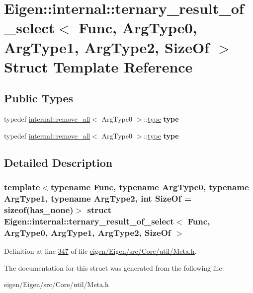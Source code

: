 \hypertarget{struct_eigen_1_1internal_1_1ternary__result__of__select}{}\section{Eigen\+:\+:internal\+:\+:ternary\+\_\+result\+\_\+of\+\_\+select$<$ Func, Arg\+Type0, Arg\+Type1, Arg\+Type2, Size\+Of $>$ Struct Template Reference}
\label{struct_eigen_1_1internal_1_1ternary__result__of__select}
\subsection*{Public Types}
\begin{DoxyCompactItemize}
\item 
\mbox{\label{struct_eigen_1_1internal_1_1ternary__result__of__select_afdca930a891955c2a1558818c245e606}} 
typedef \hyperlink{struct_eigen_1_1internal_1_1remove__all}{internal\+::remove\+\_\+all}$<$ Arg\+Type0 $>$\+::\hyperlink{group___sparse_core___module}{type} {\bfseries type}
\item 
\mbox{\label{struct_eigen_1_1internal_1_1ternary__result__of__select_afdca930a891955c2a1558818c245e606}} 
typedef \hyperlink{struct_eigen_1_1internal_1_1remove__all}{internal\+::remove\+\_\+all}$<$ Arg\+Type0 $>$\+::\hyperlink{group___sparse_core___module}{type} {\bfseries type}
\end{DoxyCompactItemize}


\subsection{Detailed Description}
\subsubsection*{template$<$typename Func, typename Arg\+Type0, typename Arg\+Type1, typename Arg\+Type2, int Size\+Of = sizeof(has\+\_\+none)$>$\newline
struct Eigen\+::internal\+::ternary\+\_\+result\+\_\+of\+\_\+select$<$ Func, Arg\+Type0, Arg\+Type1, Arg\+Type2, Size\+Of $>$}



Definition at line \hyperlink{eigen_2_eigen_2src_2_core_2util_2_meta_8h_source_l00347}{347} of file \hyperlink{eigen_2_eigen_2src_2_core_2util_2_meta_8h_source}{eigen/\+Eigen/src/\+Core/util/\+Meta.\+h}.



The documentation for this struct was generated from the following file\+:\begin{DoxyCompactItemize}
\item 
eigen/\+Eigen/src/\+Core/util/\+Meta.\+h\end{DoxyCompactItemize}
